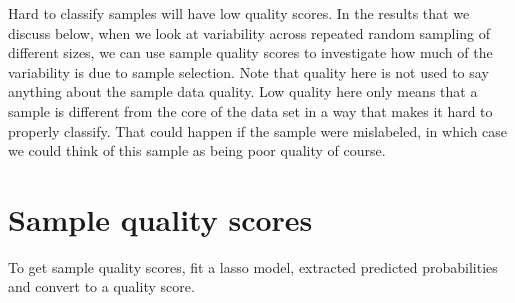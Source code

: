 \documentclass[
]{book}
\begin{document}
Hard to classify samples will have low quality scores.
In the results that we discuss below, when we look at variability across repeated
random sampling of different sizes, we can use sample quality scores to investigate
how much of the variability is due to sample selection.
Note that quality here is not used to say anything about the sample data quality.
Low quality here only means that a sample is different from the
core of the data set in a way that makes it hard to properly classify.
That could happen if the sample were mislabeled, in which case we could
think of this sample as being poor quality of course.

\hypertarget{sample-quality-scores}{%
\section{Sample quality scores}\label{sample-quality-scores}}

To get sample quality scores, fit a lasso model, extracted predicted probabilities and
convert to a quality score.
\end{document}
